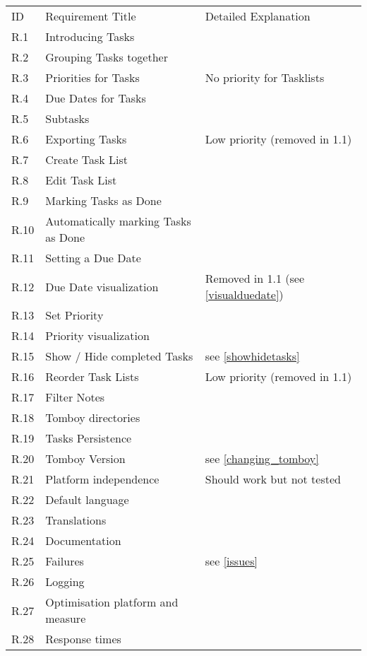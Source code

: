 \begin{tabular}{lll}
\rowcolor[gray]{0.9}
ID  & Requirement Title   & Detailed Explanation	\\
\completed	R.1		& Introducing Tasks   & 						\\
\completed	R.2		& Grouping Tasks together & \\
\parts		R.3		& Priorities for Tasks & No priority for Tasklists\\
\completed	R.4		& Due Dates for Tasks & \\
\completed	R.5		& Subtasks & \\
\notdone	R.6		& Exporting Tasks & Low priority (removed in 1.1)\\
\completed	R.7		& Create Task List & \\
\completed	R.8		& Edit Task List & \\
\completed	R.9		& Marking Tasks as Done & \\
\completed	R.10	& Automatically marking Tasks as Done & \\
\completed	R.11	& Setting a Due Date & \\
\notdone	R.12	& Due Date visualization & Removed in 1.1 (see \ref{visualduedate})\\
\completed	R.13	& Set Priority & \\
\completed	R.14	& Priority visualization & \\
\parts		R.15	& Show / Hide completed Tasks & see \ref{showhidetasks}\\
\notdone	R.16	& Reorder Task Lists & Low priority (removed in 1.1)\\
\completed	R.17	& Filter Notes & \\
\completed	R.18	& Tomboy directories & \\
\completed	R.19	& Tasks Persistence & \\
\notdone	R.20	& Tomboy Version & see \ref{changing_tomboy}\\
\parts		R.21	& Platform independence & Should work but not tested\\
\completed	R.22	& Default language & \\
\completed	R.23	& Translations & \\
\completed	R.24	& Documentation & \\
\parts		R.25	& Failures & see \ref{issues} \\
\completed	R.26	& Logging & \\
\completed	R.27	& Optimisation platform and measure & \\
\completed	R.28	& Response times & \\

\end{tabular}
